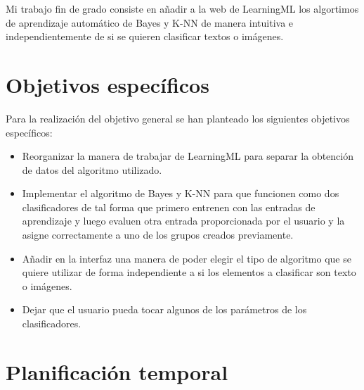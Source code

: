 \documentclass[a4paper, 12pt]{book}
\begin{document}
Mi trabajo fin de grado consiste en añadir a la web de LearningML los algortimos de aprendizaje automático de Bayes y K-NN de manera intuitiva e independientemente de si se quieren clasificar textos o imágenes.

\section{Objetivos específicos}
\label{sec:objetivos-especificos}

Para la realización del objetivo general se han planteado los siguientes objetivos específicos:
\begin{itemize}
  
	\item Reorganizar la manera de trabajar de LearningML para separar la obtención de datos del algoritmo utilizado.
 
	\item Implementar el algoritmo de Bayes y K-NN para que funcionen como dos clasificadores de tal forma que primero entrenen con las entradas de aprendizaje y luego evaluen otra entrada proporcionada por el usuario y la asigne correctamente a uno de los grupos creados previamente.
  
	\item Añadir en la interfaz una manera de poder elegir el tipo de algoritmo que se quiere utilizar de forma independiente a si los elementos a clasificar son texto o imágenes.

	\item Dejar que el usuario pueda tocar algunos de los parámetros de los clasificadores.

\end{itemize}


\section{Planificación temporal}
\label{sec:planificacion-temporal}
\end{document}
